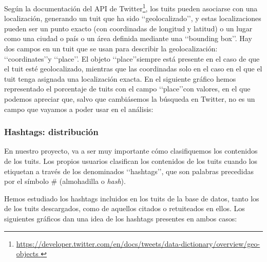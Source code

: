 Según la documentación del API de Twitter\footnote{\url{https://developer.twitter.com/en/docs/tweets/data-dictionary/overview/geo-objects }},
los tuits pueden asociarse con una localización, generando un tuit que ha sido \lq\lq geolocalizado\rq\rq, y estas localizaciones pueden ser un punto exacto (con coordinadas de longitud y latitud) o un lugar como una ciudad o país o un área definida mediante una \lq\lq bounding box\rq\rq. Hay dos campos en un tuit que se usan para describir la geolocalización: \lq\lq coordinates\rq\rq y \lq\lq place\rq\rq. El objeto \lq\lq place\rq\rq siempre está presente en el caso de que el tuit esté geolocalizado, mientras que las coordinadas solo en el caso en el que el tuit tenga asignada una localización exacta. En el siguiente gráfico hemos 
representado el porcentaje de tuits con el campo \lq\lq place\rq\rq con valores, en el que
podemos apreciar que, salvo que cambiásemos la búsqueda en Twitter, no es un campo que vayamos a poder usar en el análisis:




\subsubsection{Hashtags: distribución}
En nuestro proyecto, va a ser muy importante cómo clasifiquemos los contenidos de los tuits. 
Los propios usuarios clasifican los contenidos de los tuits cuando los etiquetan a través
de los denominados \lq\lq hashtags\rq\rq,  que son palabras precedidas por el símbolo \# 
(almohadilla o {\em hash}).

Hemos estudiado los hashtags incluidos en los tuits de la base de datos, tanto los de los tuits
descargados, como de aquellos citados o retuiteados en ellos. Los siguientes gráficos dan una idea de los hashtags presentes en ambos casos:


